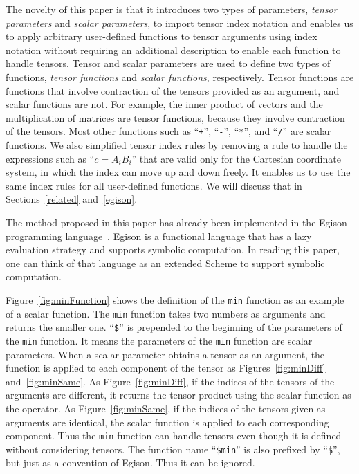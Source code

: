 \documentclass[acmlarge]{acmart}
\begin{document}
The novelty of this paper is that it introduces two types of parameters, \textit{tensor parameters} and \textit{scalar parameters}, to import tensor index notation and enables us to apply arbitrary user-defined functions to tensor arguments using index notation without requiring an additional description to enable each function to handle tensors.
Tensor and scalar parameters are used to define two types of functions, \textit{tensor functions} and \textit{scalar functions}, respectively.
Tensor functions are functions that involve contraction of the tensors provided as an argument, and scalar functions are not.
For example, the inner product of vectors and the multiplication of matrices are tensor functions, because they involve contraction of the tensors.
Most other functions such as ``\texttt{+}'', ``\texttt{-}'', ``\texttt{*}'', and ``\texttt{/}'' are scalar functions.
We also simplified tensor index rules by removing a rule to handle the expressions such as ``$c = A_i B_i$'' that are valid only for the Cartesian coordinate system, in which the index can move up and down freely.
It enables us to use the same index rules for all user-defined functions.
We will discuss that in Sections~\ref{related} and~\ref{egison}.

The method proposed in this paper has already been implemented in the Egison programming language~\cite{egison}.
Egison is a functional language that has a lazy evaluation strategy and supports symbolic computation.
In reading this paper, one can think of that language as an extended Scheme to support symbolic computation.

Figure~\ref{fig:minFunction} shows the definition of the \texttt{min} function as an example of a scalar function.
The \texttt{min} function takes two numbers as arguments and returns the smaller one.
``\texttt{\$}'' is prepended to the beginning of the parameters of the \texttt{min} function.
It means the parameters of the \texttt{min} function are scalar parameters.
When a scalar parameter obtains a tensor as an argument, the function is applied to each component of the tensor as Figures~\ref{fig:minDiff} and~\ref{fig:minSame}.
As Figure~\ref{fig:minDiff}, if the indices of the tensors of the arguments are different, it returns the tensor product using the scalar function as the operator.
As Figure~\ref{fig:minSame}, if the indices of the tensors given as arguments are identical, the scalar function is applied to each corresponding component.
Thus the \texttt{min} function can handle tensors even though it is defined without considering tensors.
The function name ``\texttt{\$min}'' is also prefixed by ``\texttt{\$}'', but just as a convention of Egison.
Thus it can be ignored.
\end{document}

